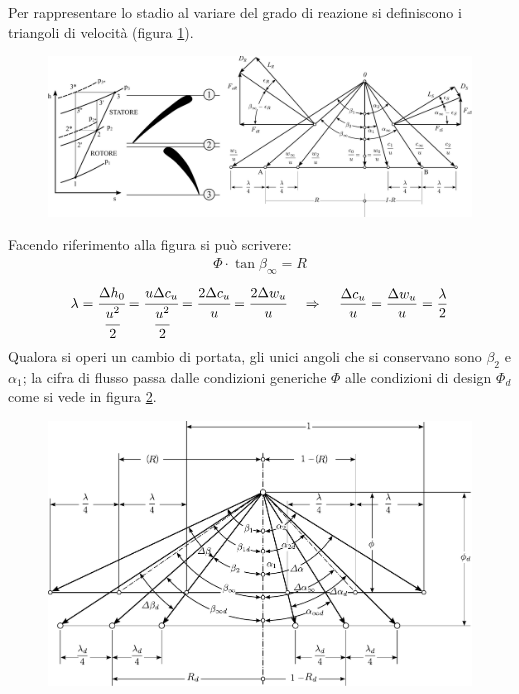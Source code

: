 Per rappresentare lo stadio al variare del grado di reazione si definiscono i triangoli di velocità (figura \ref{fig:StadioRipetuto}).
\begin{figure}[h!]
\centering
  \includegraphics[width=\textwidth]{fig/StadioRipetuto.pdf}
\caption{}
\label{fig:StadioRipetuto}
\end{figure}
Facendo riferimento alla figura si può scrivere:
\begin{align*}
\Phi \cdot \tan \beta_{\infty} = R
\end{align*}
\begin{equation}\label{eq:lambda}
\lambda = \cfrac{\Delta h_0}{\cfrac{u^2}{2}} = \cfrac{u \Delta c_u}{\cfrac{u^2}{2}} = \cfrac{2 \Delta c_u}{u} = \cfrac{2 \Delta w_u}{u} \;\;\;\; \Rightarrow \;\;\;\; \frac{\Delta c_u}{u} = \frac{\Delta w_u}{u} = \frac{\lambda}{2}
\end{equation}
Qualora si operi un cambio di portata, gli unici angoli che si conservano sono $\beta_2$ e $\alpha_1$; la cifra di flusso passa dalle condizioni generiche $\Phi$ alle condizioni di design $\Phi_d$ come si vede in figura \ref{fig:CondFuoriProg}.
\begin{figure}
\centering
  \includegraphics[width=\textwidth]{fig/CondFuoriProg.pdf}
\caption{}
\label{fig:CondFuoriProg}
\end{figure}

